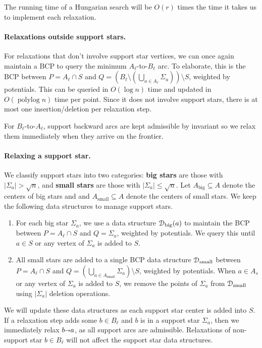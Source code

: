 \documentclass[11pt]{article}
\def\polylog{\mathop{\mathrm{polylog}}}
\def\abs#1{\mathopen| #1 \mathclose|}		%
\def\arcto{\mathord\shortrightarrow}
\def\arc#1#2{#1\arcto#2}
\theoremstyle{plain}
\numberwithin{figure}{section}
\def\EMPH#1{\textbf{\boldmath #1}}
\begin{document}
The running time of a Hungarian search will be $O(r)$ times the time it takes
us to implement each relaxation.

\paragraph{Relaxations outside support stars.}
For relaxations that don't involve support star vertices, we can once again
maintain a BCP to query the minimum $A_\ell$-to-$B_\ell$ arc.
To elaborate, this is the BCP between $P = A_\ell \cap S$ and
$Q = (B_\ell \setminus (\bigcup_{a \in A_\ell} \Sigma_a)) \setminus S$,
weighted by potentials.
This can be queried in $O(\log n)$ time and updated in $O(\polylog n)$ time per
point.
Since it does not involve support stars, there is at most one
insertion/deletion per relaxation step.

For $B_\ell$-to-$A_\ell$, support backward arcs are kept admissible by invariant
so we relax them immediately when they arrive on the frontier.

\paragraph{Relaxing a support star.}
We classify support stars into two categories: \EMPH{big stars} are those with
$\abs{\Sigma_a} > \sqrt{n}$, and \EMPH{small stars} are those with
$\abs{\Sigma_a} \leq \sqrt{n}$.
Let $A_\text{big} \subseteq A$ denote the centers of big stars and
and $A_\text{small} \subseteq A$ denote the centers of small stars.
We keep the following data structures to manage support stars.
\begin{enumerate}
\item For each big star $\Sigma_a$, we use a data structure
	$\EuScript{D}_\text{big}(a)$ to maintain the BCP between
	$P = A_\ell \cap S$ and $Q = \Sigma_a$, weighted by potentials.
	We query this until $a \in S$ or any vertex of $\Sigma_a$ is added to
	$S$.
\item All small stars are added to a single BCP data structure
	$\EuScript{D}_\text{small}$ between $P = A_\ell \cap S$ and
	$Q = (\bigcup_{a \in A_\text{small}} \Sigma_a) \setminus S$, weighted by
	potentials.
	When $a \in A_s$ or any vertex of $\Sigma_a$ is added to $S$,
	we remove the points of $\Sigma_a$ from $\EuScript{D}_\text{small}$
	using $\abs{\Sigma_a}$ deletion operations.
\end{enumerate}
We will update these data structures as each support star center is added into
$S$.
If a relaxation step adds some $b \in B_\ell$ and $b$ is in a support star
$\Sigma_a$, then we immediately relax $\arc ba$, as all support arcs are
admissible.
Relaxations of non-support star $b \in B_\ell$ will not affect the support star
data structures.
\end{document}
